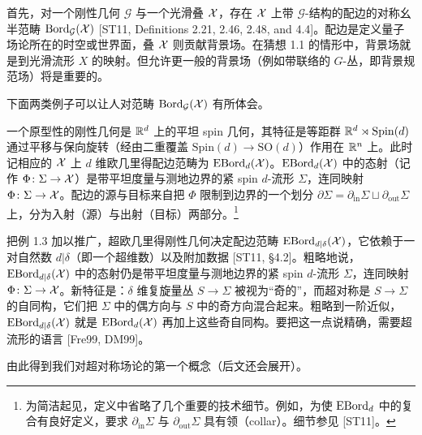 首先，对一个刚性几何 $\mathcal G$ 与一个光滑叠 $\mathcal{X}$，存在 $\mathcal{X}$ 上带 $\mathcal G$-结构的配边的对称幺半范畴 $\operatorname{Bord}_{\mathcal G}(\mathcal{X})$ [ST11, Definitions 2.21, 2.46, 2.48, and 4.4]。配边是定义量子场论所在的时空或世界面，叠 $\mathcal{X}$ 则贡献背景场。在猜想 1.1 的情形中，背景场就是到光滑流形 $X$ 的映射。但允许更一般的背景场（例如带联络的 $G$-丛，即背景规范场）将是重要的。

下面两类例子可以让人对范畴 $\operatorname{Bord}_{\mathcal G}(\mathcal{X})$ 有所体会。

\begin{example}[1.3（欧几里得配边范畴）]
一个原型性的刚性几何是 $\mathbb{R}^d$ 上的平坦 spin 几何，其特征是等距群 $\mathbb{R}^d\rtimes\mathrm{Spin}(d)$ 通过平移与保向旋转（经由二重覆盖 $\mathrm{Spin}(d)\to\mathrm{SO}(d)$）作用在 $\mathbb{R}^n$ 上。此时记相应的 $\mathcal{X}$ 上 $d$ 维欧几里得配边范畴为 $\operatorname{EBord}_d(\mathcal{X})$。$\operatorname{EBord}_d(\mathcal{X})$ 中的态射（记作 $\Phi\colon\Sigma\to\mathcal{X}$）是带平坦度量与测地边界的紧 spin $d$-流形 $\Sigma$，连同映射 $\Phi\colon\Sigma\to\mathcal{X}$。配边的源与目标来自把 $\Phi$ 限制到边界的一个划分 $\partial\Sigma=\partial_{\mathrm{in}}\Sigma\sqcup\partial_{\mathrm{out}}\Sigma$ 上，分为入射（源）与出射（目标）两部分。\footnote{为简洁起见，定义中省略了几个重要的技术细节。例如，为使 $\operatorname{EBord}_d$ 中的复合有良好定义，要求 $\partial_{\mathrm{in}}\Sigma$ 与 $\partial_{\mathrm{out}}\Sigma$ 具有领（collar）。细节参见 [ST11]。}
\end{example}

\begin{example}[1.4（超欧几里得配边范畴）]
把例 1.3 加以推广，超欧几里得刚性几何决定配边范畴 $\operatorname{EBord}_{d|\delta}(\mathcal{X})$，它依赖于一对自然数 $d|\delta$（即一个超维数）以及附加数据 [ST11, §4.2]。粗略地说，$\operatorname{EBord}_{d|\delta}(\mathcal{X})$ 中的态射仍是带平坦度量与测地边界的紧 spin $d$-流形 $\Sigma$，连同映射 $\Phi\colon\Sigma\to\mathcal{X}$。新特征是：$\delta$ 维复旋量丛 $S\to\Sigma$ 被视为“奇的”，而超对称是 $S\to\Sigma$ 的自同构，它们把 $\Sigma$ 中的偶方向与 $S$ 中的奇方向混合起来。粗略到一阶近似，$\operatorname{EBord}_{d|\delta}(\mathcal{X})$ 就是 $\operatorname{EBord}_d(\mathcal{X})$ 再加上这些奇自同构。要把这一点说精确，需要超流形的语言 [Fre99, DM99]。
\end{example}

由此得到我们对超对称场论的第一个概念（后文还会展开）。

